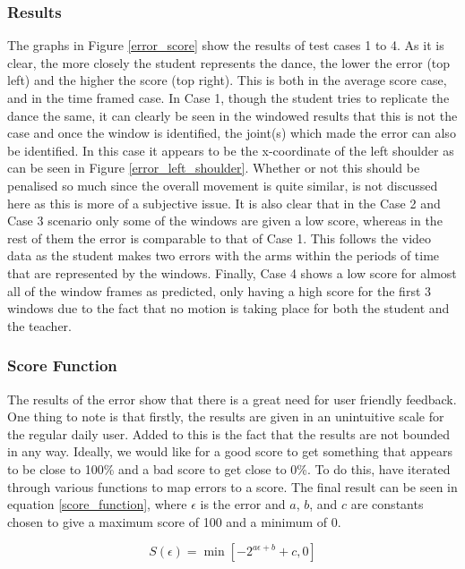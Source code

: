 \documentclass[a4paper]{article}
\begin{document}
\subsubsection{Results}
\noindent
The graphs in Figure \ref{error_score} show the results of test cases 1 to 4. As it is clear, the more closely the student represents the dance, the lower the error (top left) and the higher the score (top right). This is both in the average score case, and in the time framed case. In Case 1, though the student tries to replicate the dance the same, it can clearly be seen in the windowed results that this is not the case and once the window is identified, the joint(s) which made the error can also be identified. In this case it appears to be the x-coordinate of the left shoulder as can be seen in Figure \ref{error_left_shoulder}. Whether or not this should be penalised so much since the overall movement is quite similar, is not discussed here as this is more of a subjective issue. It is also clear that in the Case 2 and Case 3 scenario only some of the windows are given a low score, whereas in the rest of them the error is comparable to that of Case 1. This follows the video data as the student makes two errors with the arms within the periods of time that are represented by the windows. Finally, Case 4 shows a low score for almost all of the window frames as predicted, only having a high score for the first 3 windows due to the fact that no motion is taking place for both the student and the teacher. 

\subsubsection{Score Function}
\noindent
The results of the error show that there is a great need for user friendly feedback. One thing to note is that firstly, the results are given in an unintuitive scale for the regular daily user. Added to this is the fact that the results are not bounded in any way. Ideally, we would like for a good score to get something that appears to be close to 100\% and a bad score to get close to 0\%. To do this, have iterated through various functions to map errors to a score. The final result can be seen in equation \eqref{score_function}, where $\epsilon$ is the error and $a$, $b$, and $c$ are constants chosen to give a maximum score of 100 and a minimum of 0.

 
\begin{equation}
S(\epsilon) = \min\left[ -2^{a\epsilon + b}+c, 0 \right]
\end{equation}
\end{document}
